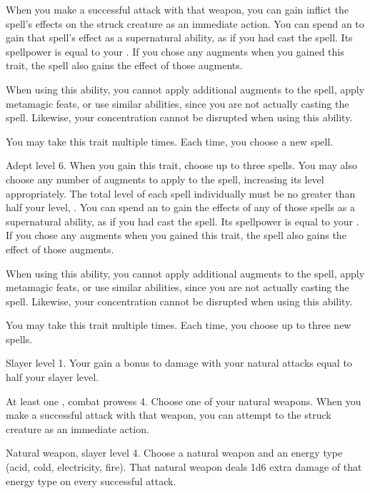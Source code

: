     When you make a successful attack with that weapon, you can gain inflict the spell's effects on the struck creature as an immediate action.
    You can spend an  to gain that spell's effect as a supernatural ability, as if you had cast the spell.
    Its spellpower is equal to your .
    If you chose any augments when you gained this trait, the spell also gains the effect of those augments.

    When using this ability, you cannot apply additional augments to the spell, apply metamagic feats, or use similar abilities, since you are not actually casting the spell.
    Likewise, your concentration cannot be disrupted when using this ability.

     You may take this trait multiple times.
    Each time, you choose a new spell.

    \featpre Adept level 6.
    \featben When you gain this trait, choose up to three spells.
    You may also choose any number of augments to apply to the spell, increasing its level appropriately.
    The total level of each spell individually must be no greater than half your level, .
    You can spend an  to gain the effects of any of those spells as a supernatural ability, as if you had cast the spell.
    Its spellpower is equal to your .
    If you chose any augments when you gained this trait, the spell also gains the effect of those augments.

    When using this ability, you cannot apply additional augments to the spell, apply metamagic feats, or use similar abilities, since you are not actually casting the spell.
    Likewise, your concentration cannot be disrupted when using this ability.

     You may take this trait multiple times.
    Each time, you choose up to three new spells.

    \featpre Slayer level 1.
    \featben Your gain a bonus to damage with your natural attacks equal to half your slayer level.

    \featpre At least one , combat prowess 4.
    \featben Choose one of your natural weapons.
    When you make a successful attack with that weapon, you can attempt to  the struck creature as an immediate action.

    \featpre Natural weapon, slayer level 4.
    \featben Choose a natural weapon and an energy type (acid, cold, electricity, fire).
    That natural weapon deals 1d6 extra damage of that energy type on every successful attack.


